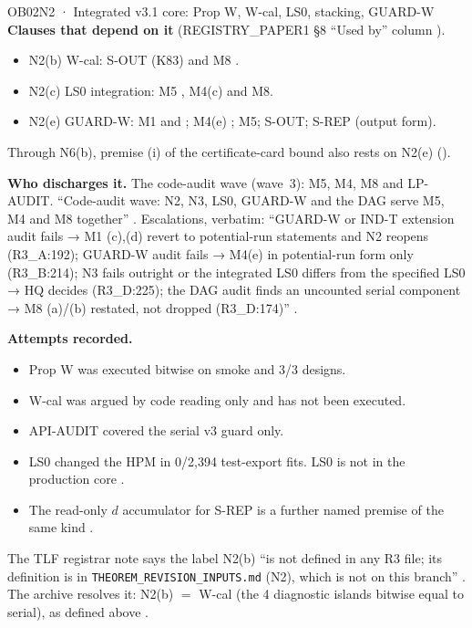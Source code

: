 \begin{card}{OB02}{N2 · Integrated v3.1 core: Prop W, W-cal, LS0, stacking, GUARD-W}
\textbf{Clauses that depend on it} (REGISTRY\_PAPER1 §8 ``Used by'' column ).
\begin{itemize}
\item N2(b) W-cal: S-OUT  (K83) and M8 .
\item N2(c) LS0 integration: M5 , M4(c)  and M8.
\item N2(e) GUARD-W: M1  and ; M4(e) ; M5; S-OUT; S-REP  (output form).
\end{itemize}
Through N6(b), premise (i) of the certificate-card bound also rests on N2(e) ().

\textbf{Who discharges it.} The code-audit wave (wave~3): M5, M4, M8 and LP-AUDIT. ``Code-audit wave: N2, N3, LS0, GUARD-W and the DAG serve M5, M4 and M8 together'' . Escalations, verbatim: ``GUARD-W or IND-T extension audit fails → M1 (c),(d) revert to potential-run statements and N2 reopens (R3\_A:192); GUARD-W audit fails → M4(e) in potential-run form only (R3\_B:214); N3 fails outright or the integrated LS0 differs from the specified LS0 → HQ decides (R3\_D:225); the DAG audit finds an uncounted serial component → M8 (a)/(b) restated, not dropped (R3\_D:174)'' .

\textbf{Attempts recorded.}
\begin{itemize}
\item Prop W was executed bitwise on smoke and 3/3 designs.
\item W-cal was argued by code reading only and has not been executed.
\item API-AUDIT covered the serial v3 guard only.
\item LS0 changed the HPM in 0/2,394 test-export fits. LS0 is not in the production core .
\item The read-only $d$ accumulator for S-REP is a further named premise of the same kind .
\end{itemize}
\begin{uncertain}[N2(b) label]
The TLF registrar note says the label N2(b) ``is not defined in any R3 file; its definition is in \texttt{THEOREM\_REVISION\_INPUTS.md} (N2), which is not on this branch'' . The archive resolves it: N2(b) $=$ W-cal (the 4 diagnostic islands bitwise equal to serial), as defined above .
\end{uncertain}
\end{card}

